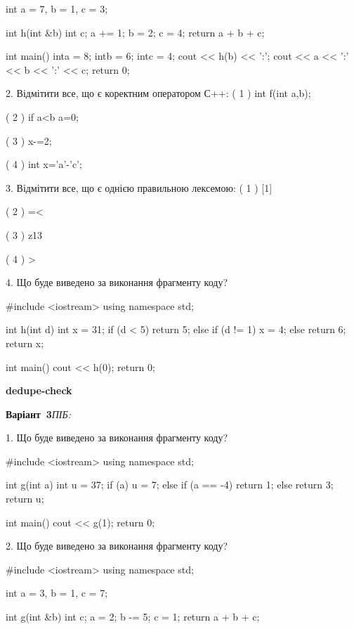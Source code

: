 \documentclass[11pt]{article}
\begin{document}
int a = 7, b = 1, c = 3;

int h(int &b){
int c;    a += 1;
    b = 2;
    c = 4;
    return a + b + c;
}

int main(){
    inta = 8;
    intb = 6;
    intc = 4;
    cout << h(b) << ':';
    cout << a << ':' << b << ':' << c;
    return 0; 
}

2. Відмітити все, що є коректним оператором С++:
( 1 ) int f(int a,b);

( 2 ) if a<b a=0;

( 3 ) x-=2;

( 4 ) int x='a'-'c';

3. Відмітити все, що є однією правильною лексемою:
( 1 ) [1]

( 2 ) =<

( 3 ) z13

( 4 ) >

4. Що буде виведено за виконання фрагменту коду?

#include <iostream>
using namespace std;

int h(int d){
    int x = 31;
    if (d < 5) 
        return 5;
    else if (d != 1)
         x = 4;
    else
         return 6;
    return x;
}

int main(){
    cout << h(0);
    return 0;
}






\newpage
{\large\textbf{dedupe-check}}

\textbf{Варіант \No\,3}\hfill \textit{ПІБ:}\,\underline{\hspace{60mm}}
\vspace{4mm}

1. Що буде виведено за виконання фрагменту коду?

#include <iostream>
using namespace std;

int g(int a){
    int u = 37;
    if (a) 
        u = 7;
    else if (a == -4)
         return 1;
    else
         return 3;
    return u;
}

int main(){
    cout << g(1);
    return 0;
}


2. Що буде виведено за виконання фрагменту коду?

#include <iostream>
using namespace std;

int a = 3, b = 1, c = 7;

int g(int &b){
int c;    a = 2;
    b -= 5;
    c = 1;
    return a + b + c;
}
\end{document}

